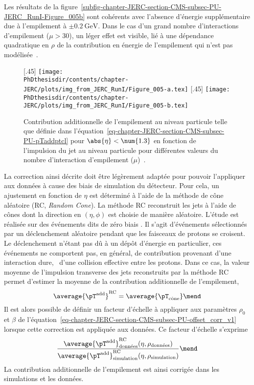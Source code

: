 Les résultats de la figure~\ref{subfig-chapter-JERC-section-CMS-subsec-PU-JERC_RunI-Figure_005b} sont cohérents avec l'absence d'énergie supplémentaire due à l'empilement à $\pm\SI{0.2}{\GeV}$. Dans le cas d'un grand nombre d'interactions d'empilement ($\mu>30$), un léger effet est visible, lié à une dépendance quadratique en $\rho$ de la contribution en énergie de l'empilement qui n'est pas modélisée~\cite{JERC_RunI}.
\begin{figure}[h]
\centering
{}[.45\textwidth]
{\texttt{[image: \\PhDthesisdir/contents/chapter-JERC/plots/img\_from\_JERC\_RunI/Figure\_005-a.tex]}}
\hfill
{}[.45\textwidth]
{\texttt{[image: \\PhDthesisdir/contents/chapter-JERC/plots/img\_from\_JERC\_RunI/Figure\_005-b.tex]}}
\caption[Contribution additionnelle de l'empilement au niveau particule.]{Contribution additionnelle de l'empilement au niveau particule telle que définie dans l'équation~\eqref{eq-chapter-JERC-section-CMS-subsec-PU-pTaddptcl} pour $\abs{\eta}<\num{1.3}$ en fonction de l'impulsion du jet au niveau particule pour différentes valeurs du nombre d'interaction d'empilement ($\mu$)~\cite{JERC_RunI}.}
\label{fig-chapter-JERC-section-CMS-subsec-PU-JERC_RunI-Figure_005}
\end{figure}
\par La correction ainsi décrite doit être légèrement adaptée pour pouvoir l'appliquer aux données à cause des biais de simulation du détecteur.
Pour cela, un ajustement en fonction de $\eta$ est déterminé à l'aide de la méthode de cône aléatoire (RC, \emph {Random Cone}). La méthode RC reconstruit les jets à l'aide de cônes dont la direction en $(\eta, \phi)$ est choisie de manière aléatoire.
L'étude est réalisée sur des événements dits de \og zéro biais \fg.
Il s'agit d'événements sélectionnés par un déclenchement aléatoire pendant que les faisceaux de protons se croisent.
Le déclenchement n'étant pas dû à un dépôt d'énergie en particulier, ces événements ne comportent pas, en général, de contribution provenant d'une interaction dure, \ie\ d'une collision effective entre les protons.
Dans ce cas, la valeur moyenne de l'impulsion transverse des jets reconstruits par la méthode RC permet d'estimer la moyenne de la contribution additionnelle de l'empilement, \ie
\begin{equation}
\average{\pT^\text{add}}^\text{RC} = \average{\pT_\text{cône}}
\mend
\end{equation}
Il est alors possible de définir un facteur d'échelle à appliquer aux paramètres $\rho_0$ et $\beta$ de l'équation~\eqref{eq-chapter-JERC-section-CMS-subsec-PU-offset_corr_v1} lorsque cette correction est appliquée aux données. Ce facteur d'échelle s'exprime
\begin{equation}
\frac{\average{\pT^\text{add}}^\text{RC}_\text{données}(\eta, \rho_\text{données})}{\average{\pT^\text{add}}^\text{RC}_\text{simulation}(\eta, \rho_\text{simulation})}
\mend
\end{equation}
La contribution additionnelle de l'empilement est ainsi corrigée dans les simulations et les données.
